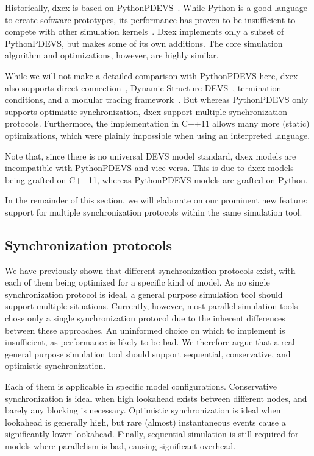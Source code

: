 Historically, dxex is based on PythonPDEVS~\cite{PythonPDEVS}.
While Python is a good language to create software prototypes, its performance has proven to be insufficient to compete with other simulation kernels~\cite{MasterThesis}.
Dxex implements only a subset of PythonPDEVS, but makes some of its own additions.
The core simulation algorithm and optimizations, however, are highly similar.

While we will not make a detailed comparison with PythonPDEVS here, dxex also supports direct connection~\cite{SymbolicFlattening}, \textsf{Dynamic Structure DEVS}~\cite{DSDEVS}, termination conditions, and a modular tracing framework~\cite{PythonPDEVS}.
But whereas PythonPDEVS only supports optimistic synchronization, dxex support multiple synchronization protocols.
Furthermore, the implementation in C++11 allows many more (static) optimizations, which were plainly impossible when using an interpreted language.

Note that, since there is no universal \textsf{DEVS} model standard, dxex models are incompatible with PythonPDEVS and vice versa.
This is due to dxex models being grafted on C++11, whereas PythonPDEVS models are grafted on Python.

In the remainder of this section, we will elaborate on our prominent new feature: support for multiple synchronization protocols within the same simulation tool.

\subsection{Synchronization protocols}
We have previously shown that different synchronization protocols exist, with each of them being optimized for a specific kind of model.
As no single synchronization protocol is ideal, a general purpose simulation tool should support multiple situations.
Currently, however, most parallel simulation tools chose only a single synchronization protocol due to the inherent differences between these approaches.
An uninformed choice on which to implement is insufficient, as performance is likely to be bad.
We therefore argue that a real general purpose simulation tool should support sequential, conservative, and optimistic synchronization.

Each of them is applicable in specific model configurations.
Conservative synchronization is ideal when high lookahead exists between different nodes, and barely any blocking is necessary.
Optimistic synchronization is ideal when lookahead is generally high, but rare (almost) instantaneous events cause a significantly lower lookahead.
Finally, sequential simulation is still required for models where parallelism is bad, causing significant overhead.

